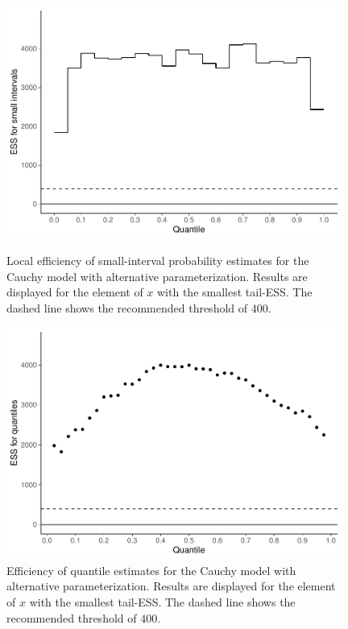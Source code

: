 \documentclass[american,]{article}
\theoremstyle{definition}
\begin{document}
\begin{figure}[tp]
  \centering
  \begin{minipage}{0.48\textwidth}
  \includegraphics[width=0.98\textwidth]{graphics/local-ess-fit-alt1-1.pdf}
  \caption{Local efficiency of small-interval probability estimates for the 
  Cauchy model with alternative parameterization. Results are displayed for
  the element of $x$ with the smallest tail-ESS. The dashed line shows the
    recommended threshold of $400$.}
\label{fig:local-ess-fit-alt1-1}
\end{minipage}
\hfill
  \begin{minipage}{0.48\textwidth}
  \includegraphics[width=0.98\textwidth]{graphics/quantile-ess-fit-alt1-1.pdf}
  \caption{Efficiency of quantile estimates for the Cauchy model with 
  alternative parameterization. Results are displayed for the element of $x$
  with the smallest tail-ESS. The dashed line shows the
    recommended threshold  of $400$.}
  \label{fig:quantile-ess-alt1-1}
\end{minipage}
\end{figure}
\end{document}
